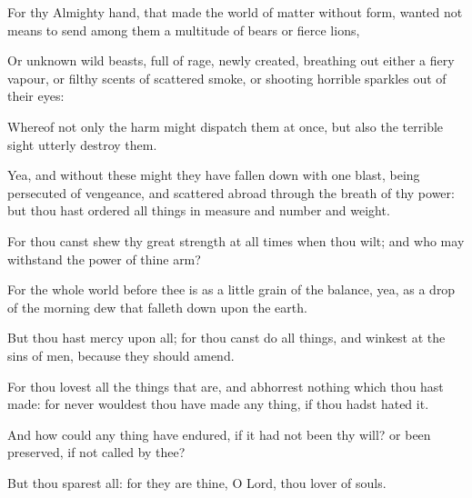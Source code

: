 {\par }{\PP {}For thy Almighty hand, that made the world of matter without form, wanted not means to send among them a multitude of bears or fierce lions,
\par }{\PP {}Or unknown wild beasts, full of rage, newly created, breathing out either a fiery vapour, or filthy scents of scattered smoke, or shooting horrible sparkles out of their eyes:
\par }{\PP {}Whereof not only the harm might dispatch them at once, but also the terrible sight utterly destroy them.
\par }{\PP {}Yea, and without these might they have fallen down with one blast, being persecuted of vengeance, and scattered abroad through the breath of thy power: but thou hast ordered all things in measure and number and weight.
\par }{\PP {}For thou canst shew thy great strength at all times when thou wilt; and who may withstand the power of thine arm?
\par }{\PP {}For the whole world before thee is as a little grain of the balance, yea, as a drop of the morning dew that falleth down upon the earth.
\par }{\PP {}But thou hast mercy upon all; for thou canst do all things, and winkest at the sins of men, because they should amend.
\par }{\PP {}For thou lovest all the things that are, and abhorrest nothing which thou hast made: for never wouldest thou have made any thing, if thou hadst hated it.
\par }{\PP {}And how could any thing have endured, if it had not been thy will? or been preserved, if not called by thee?
\par }{\PP {}But thou sparest all: for they are thine, O Lord, thou lover of souls.

}
